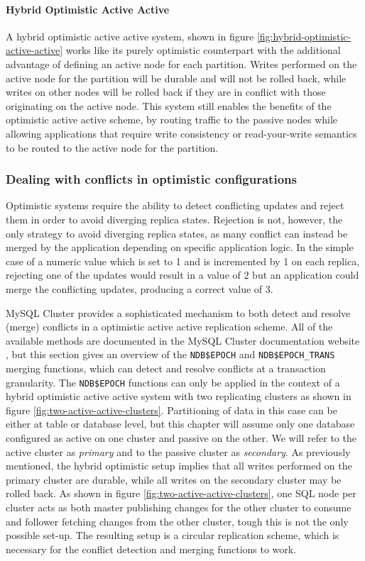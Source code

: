 \paragraph{Hybrid Optimistic Active Active}
A hybrid optimistic active active system, shown in figure \ref{fig:hybrid-optimistic-active-active} works like its purely optimistic counterpart with the additional advantage of defining an active node for each partition.
Writes performed on the active node for the partition will be durable and will not be rolled back, while writes on other nodes will be rolled back if they are in conflict with those originating on the active node.
This system still enables the benefits of the optimistic active active scheme, by routing traffic to the passive nodes while allowing applications that require write consistency or read-your-write semantics to be routed to the active node for the partition.

\subsubsection{Dealing with conflicts in optimistic configurations}
Optimistic systems require the ability to detect conflicting updates and reject them in order to avoid diverging replica states.
Rejection is not, however, the only strategy to avoid diverging replica states, as many conflict can instead be merged by the application depending on specific application logic.
In the simple case of a numeric value which is set to 1 and is incremented by 1 on each replica, rejecting one of the updates would result in a value of $2$ but an application could merge the conflicting updates, producing a correct value of 3.

MySQL Cluster provides a sophisticated mechanism to both detect and resolve (merge) conflicts in a optimistic active active replication scheme.
All of the available methods are documented in the MySQL Cluster documentation website \cite{mysql-cluster-documentation-replication}, but this section gives an overview of the \texttt{NDB\$EPOCH} and \texttt{NDB\$EPOCH\_TRANS} merging functions, which can detect and resolve conflicts at a transaction granularity.
The \texttt{NDB\$EPOCH} functions can only be applied in the context of a hybrid optimistic active active system with two replicating clusters as shown in figure \ref{fig:two-active-active-clusters}.
Partitioning of data in this case can be either at table or database level, but this chapter will assume only one database configured as active on one cluster and passive on the other.
We will refer to the active cluster as \emph{primary} and to the passive cluster as \emph{secondary}.
As previously mentioned, the hybrid optimistic setup implies that all writes performed on the primary cluster are durable, while all writes on the secondary cluster may be rolled back.
As shown in figure \ref{fig:two-active-active-clusters}, one SQL node per cluster acts as both master publishing changes for the other cluster to consume and follower fetching changes from the other cluster, tough this is not the only possible set-up.
The resulting setup is a circular replication scheme, which is necessary for the conflict detection and merging functions to work.

